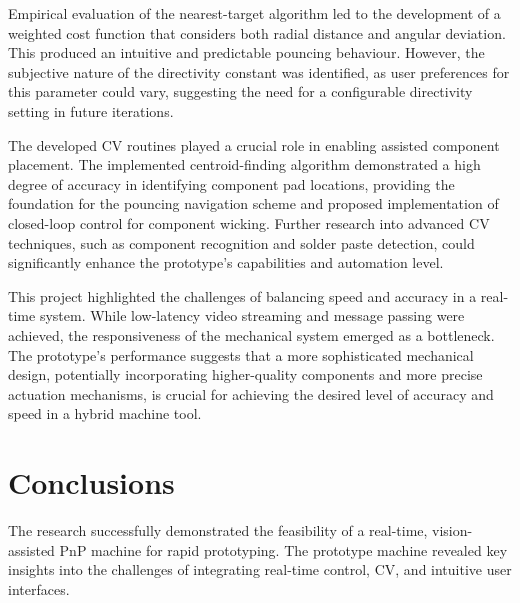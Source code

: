 \documentclass[12pt,british,UKenglish]{article}
\begin{document}
Empirical evaluation of the nearest-target algorithm led to the development of a weighted cost function that considers both radial distance and angular deviation.
This produced an intuitive and predictable pouncing behaviour.
However, the subjective nature of the directivity constant was identified, as user preferences for this parameter could vary, suggesting the need for a configurable directivity setting in future iterations.

The developed \ac{CV} routines played a crucial role in enabling assisted component placement.
The implemented centroid-finding algorithm demonstrated a high degree of accuracy in identifying component pad locations, providing the foundation for the pouncing navigation scheme and proposed implementation of closed-loop control for component wicking.
Further research into advanced \ac{CV} techniques, such as component recognition and solder paste detection, could significantly enhance the prototype's capabilities and automation level.

This project highlighted the challenges of balancing speed and accuracy in a real-time system.
While low-latency video streaming and message passing were achieved, the responsiveness of the mechanical system emerged as a bottleneck.
The prototype's performance suggests that a more sophisticated mechanical design, potentially incorporating higher-quality components and more precise actuation mechanisms, is crucial for achieving the desired level of accuracy and speed in a hybrid machine tool.


\section{Conclusions}\label{sec:Conclusions}


The research successfully demonstrated the feasibility of a real-time, vision-assisted \acl{PnP} machine for rapid prototyping.
The prototype machine revealed key insights into the challenges of integrating real-time control, \acl{CV}, and intuitive user interfaces.
\end{document}

